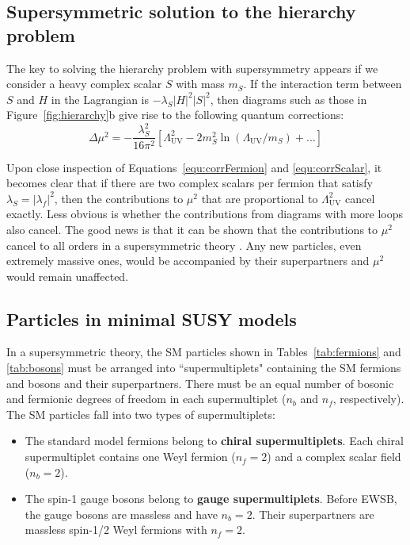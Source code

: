 \subsection{Supersymmetric solution to the hierarchy problem}
\label{sec:SUSYhierarchy}

The key to solving the hierarchy problem with supersymmetry appears if we consider a heavy complex scalar $S$ with mass $m_S$. If the interaction term between $S$ and $H$ in the Lagrangian is $-\lambda_S|H|^2|S|^2$, then diagrams such as those in Figure~\ref{fig:hierarchy}b give rise to the following quantum corrections:
\begin{equation}
\Delta\mu^2 = -\frac{\lambda_S^2}{16\pi^2} [ \Lambda^2_\mathrm{UV} - 2 m_S^2 \ln{(\Lambda_\mathrm{UV} / m_S) }+ ... ]
\label{equ:corrScalar}
\end{equation}

Upon close inspection of Equations~\ref{equ:corrFermion} and \ref{equ:corrScalar}, it becomes clear that if
there are two complex scalars per fermion that satisfy $\lambda_S = |\lambda_f|^2$, then the contributions to $\mu^2$ 
that are proportional to $ \Lambda^2_\mathrm{UV}$ cancel exactly. 
Less obvious is whether the contributions from diagrams with more loops also cancel. The good news is that it can be shown that 
the contributions to $\mu^2$ cancel to all orders in a supersymmetric theory \cite{SUSYproof}. Any new particles, even extremely massive ones, would be
accompanied by their superpartners and $\mu^2$ would remain unaffected.


\subsection{Particles in minimal SUSY models}
\label{sec:SUSYparticles}
In a supersymmetric theory, the SM particles shown in Tables~\ref{tab:fermions} and \ref{tab:bosons} must be arranged into ``supermultiplets" containing the SM fermions and bosons and their superpartners. There must be an equal number of bosonic and fermionic degrees of freedom in each supermultiplet ($n_b$ and $n_f$, respectively). The SM particles fall into two types of supermultiplets:
\begin{itemize}
\item The standard model fermions belong to \textbf{chiral supermultiplets}. Each chiral supermultiplet contains one Weyl fermion ($n_f = 2$) and a complex scalar field ($n_b = 2$).
\item The spin-1 gauge bosons belong to \textbf{gauge supermultiplets}. Before EWSB, the gauge bosons are massless and have $n_b = 2$. Their superpartners are massless spin-1/2 Weyl fermions with $n_f = 2$. 
\end{itemize}

